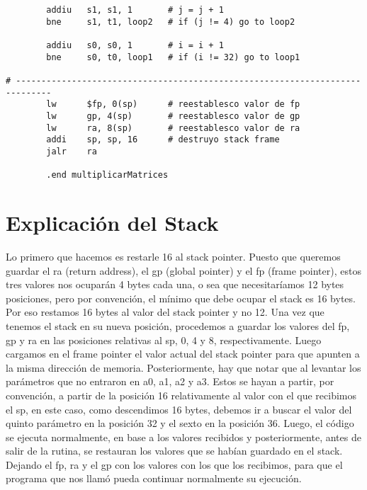 \documentclass[a4paper,10pt]{article}
\begin{document}
\begin{lstlisting}
        addiu   s1, s1, 1       # j = j + 1
        bne     s1, t1, loop2   # if (j != 4) go to loop2

        addiu   s0, s0, 1       # i = i + 1
        bne     s0, t0, loop1   # if (i != 32) go to loop1

# -----------------------------------------------------------------------------
        lw      $fp, 0(sp)      # reestablesco valor de fp
        lw      gp, 4(sp)       # reestablesco valor de gp
        lw      ra, 8(sp)       # reestablesco valor de ra
        addi    sp, sp, 16      # destruyo stack frame
        jalr    ra

        .end multiplicarMatrices
\end{lstlisting}
\pagebreak
\section{Explicaci\'on del Stack}

Lo primero que hacemos es restarle 16 al stack pointer. Puesto que queremos guardar el ra (return address), el gp (global pointer) y el fp (frame pointer), estos tres valores nos ocupar\'an 4 bytes cada una, o sea que necesitar\'iamos 12 bytes posiciones, pero por convenci\'on, el m\'inimo que debe ocupar el stack es 16 bytes. Por eso restamos 16 bytes al valor del stack pointer y no 12.
Una vez que tenemos el stack en su nueva posici\'on, procedemos a guardar los valores del fp, gp y ra en las posiciones relativas al sp, 0, 4 y 8, respectivamente. Luego cargamos en el frame pointer el valor actual del stack pointer para que apunten a la misma direcci\'on de memoria.
Posteriormente, hay que notar que al levantar los par\'ametros que no entraron en a0, a1, a2 y a3. Estos se hayan a partir, por convenci\'on, a partir de la posici\'on 16 relativamente al valor con el que recibimos el sp, en este caso, como descendimos 16 bytes, debemos ir a buscar el valor del quinto par\'ametro en la posici\'on 32 y el sexto en la posici\'on 36.
Luego, el c\'odigo se ejecuta normalmente, en base a los valores recibidos y posteriormente, antes de salir de la rutina, se restauran los valores que se hab\'ian guardado en el stack. Dejando el fp, ra y el gp con los valores con los que los recibimos, para que el programa que nos llam\'o pueda continuar normalmente su ejecuci\'on.
\end{document}
